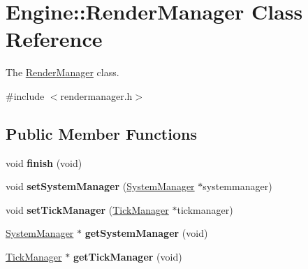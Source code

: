 \hypertarget{classEngine_1_1RenderManager}{}\section{Engine\+:\+:Render\+Manager Class Reference}
\label{classEngine_1_1RenderManager}


The \hyperlink{classEngine_1_1RenderManager}{Render\+Manager} class.  




{\ttfamily \#include $<$rendermanager.\+h$>$}

\subsection*{Public Member Functions}
\begin{DoxyCompactItemize}
\item 
\hypertarget{classEngine_1_1RenderManager_ac5745c80a5cc840117c033b0c82ccd67}{}void {\bfseries finish} (void)\label{classEngine_1_1RenderManager_ac5745c80a5cc840117c033b0c82ccd67}

\item 
\hypertarget{classEngine_1_1RenderManager_ab23d62cd43a7aa5aa86b70beeae0ee47}{}void {\bfseries set\+System\+Manager} (\hyperlink{classEngine_1_1SystemManager}{System\+Manager} $\ast$systemmanager)\label{classEngine_1_1RenderManager_ab23d62cd43a7aa5aa86b70beeae0ee47}

\item 
\hypertarget{classEngine_1_1RenderManager_a2a6d4a0f4d1c2fd00e079c2e68a5e17c}{}void {\bfseries set\+Tick\+Manager} (\hyperlink{classEngine_1_1TickManager}{Tick\+Manager} $\ast$tickmanager)\label{classEngine_1_1RenderManager_a2a6d4a0f4d1c2fd00e079c2e68a5e17c}

\item 
\hypertarget{classEngine_1_1RenderManager_a9732b4ce4ca97ce147af30da42623460}{}\hyperlink{classEngine_1_1SystemManager}{System\+Manager} $\ast$ {\bfseries get\+System\+Manager} (void)\label{classEngine_1_1RenderManager_a9732b4ce4ca97ce147af30da42623460}

\item 
\hypertarget{classEngine_1_1RenderManager_ae78f85dd1f25126e5a2f3da414b2b114}{}\hyperlink{classEngine_1_1TickManager}{Tick\+Manager} $\ast$ {\bfseries get\+Tick\+Manager} (void)\label{classEngine_1_1RenderManager_ae78f85dd1f25126e5a2f3da414b2b114}


\end{DoxyCompactItemize}
